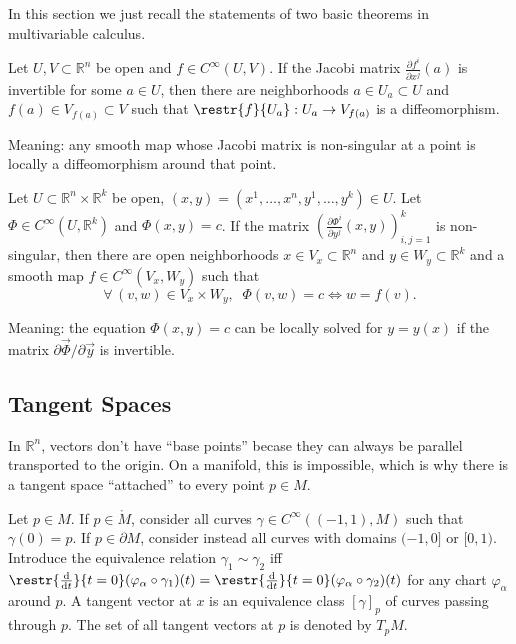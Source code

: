 \documentclass[english,letterpaper]{article}%
\numberwithin{equation}{section}
\numberwithin{figure}{section}
\numberwithin{table}{section}
\theoremstyle{definition}
\theoremstyle{definition}
\theoremstyle{definition}
\theoremstyle{plain}
\theoremstyle{plain}
\theoremstyle{plain}
\theoremstyle{plain}
\theoremstyle{remark}
\theoremstyle{remark}
\def\red{\color{red}}
\newcommand{\dd}{{\mathrm{d}}}
\newcommand{\PRLsep}{   %
           \noindent\makebox[\linewidth]{
                \resizebox{0.5\linewidth}{1pt}{$\blacklozenge$}}}
\begin{document}
In this section we just recall the statements of two basic theorems in multivariable calculus.
\begin{thm}\label{InMT}
Let $U,V\subset\mathbb{R}^n$ be open and $f\in C^\infty(U,V)$. If the Jacobi matrix $\frac{\partial f^i}{\partial x^j} (a)$ is invertible for some $a\in U$, then there are neighborhoods $a\in U_a\subset U$ and $f(a)\in V_{f(a)}\subset V$ such that $\restr{f}{U_a}:U_a\to V_{f(a)}$ is a diffeomorphism.
\end{thm}
Meaning: any smooth map whose Jacobi matrix is non-singular at a point is locally a diffeomorphism around that point.

\begin{thm}\label{ImMT}
Let $U\subset \mathbb{R}^n\times \mathbb{R}^k$ be open, $(x,y)=(x^1,\ldots,x^n,y^1,\ldots,y^k)\in U$. Let $\Phi\in C^\infty(U,\mathbb{R}^k)$ and $\Phi(x,y)=c$. If the matrix $\left(\frac{\partial\Phi^i}{\partial y^j}(x,y)\right)_{i,j=1}^k$  is non-singular, then there are open neighborhoods $x\in V_x\subset \mathbb{R}^n$ and $y\in W_y\subset\mathbb{R}^k$ and a smooth map $f\in C^\infty (V_x,W_y)$ such that 
\[\forall\,(v,w)\in V_x\times W_y,\;\; \Phi (v,w)=c \Leftrightarrow w=f(v).\]
\end{thm}
Meaning: the equation $\Phi(x,y)=c$ can be locally solved for $y=y(x)$ if the matrix $\partial\Vec{\Phi}/\partial\Vec{y}$ is invertible.

\subsection{Tangent Spaces}
In $\mathbb{R}^n$, vectors don't have ``base points'' becase they can always be parallel transported to the origin. On a manifold, this is impossible, which is why there is a tangent space ``attached'' to every point $p\in M$. 
\begin{defn}
Let $p\in M$. If $p\in \mathring M$, consider all curves $\gamma\in C^\infty((-1,1),M)$ such that $\gamma(0)=p$. If $p\in \partial M$, consider instead all curves with domains $(-1,0]$ or $[0,1)$. Introduce the equivalence relation $\gamma_1\sim \gamma_2$  iff $\restr{\frac{\dd}{\dd t}}{t=0}(\varphi_\alpha\circ \gamma_1)(t)=\restr{\frac{\dd}{\dd t}}{t=0}(\varphi_\alpha\circ \gamma_2)(t)$ for any chart $\varphi_\alpha$ around $p$. A tangent vector at $x$ is an equivalence class $[\gamma]_p$ of curves passing through $p$. The set of all tangent vectors at $p$ is denoted by $T_p M$.
\end{defn}
\end{document}
